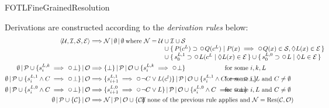 \begin{entry}{FOTLFineGrainedResolution}
\begin{calculus}
Derivations are constructed according to the \emph{derivation rules}
below:\vspace*{-2ex}
\begin{align*}
\langle \mathcal{U}, \mathcal{I}, \mathcal{S}, \mathcal{E} \rangle
&\Longrightarrow
\ProverState{\mathcal{N}}{\emptyset}{\emptyset}
\parbox[t]{25em}{\ 
\begin{tabular}[t]{@{}l@{}}
where
$\mathcal{N} = \mathcal{U}
\begin{array}[t]{@{}l@{}}
\hbox{}\cup \mathcal{I} \cup \mathcal{S}\\
\hbox{}\cup \Set{P(c^L) \supset \Next Q(c^L)}{P(x) \implies \Next Q(x) \in
  \mathcal{S}, \Eventually L(x)\in\mathcal{E}}\\
\hbox{}\cup \Set{s^{L,1}_0 \supset \Next L(c^L}{\Eventually L(x) \in
  \mathcal{E}}
\cup \Set{s^{L,0}_0 \supset \Next L}{\Eventually L \in
  \mathcal{E}}
\end{array}
$
\end{tabular}}
\\
\ProverState{\emptyset}{\ProcessedSet \cup 
\SetEnum{s^{L,k}_i \implies \Next\EmptyClause}}{\OldSet}
&\Longrightarrow
\makebox[187pt][l]{$\ProverState{\SetEnum{\EmptyClause}}{\ProcessedSet}{\OldSet \cup 
\SetEnum{s^{L,k}_i \implies \Next \EmptyClause}}$}
\mbox{ for some $i, k, L$}
\\
\ProverState{\emptyset}{\ProcessedSet \cup 
\SetEnum{s^{L,1}_i \land C \implies \Next\EmptyClause}}{\OldSet}
&\Longrightarrow
\makebox[187pt][l]{\ProverState{\SetEnum{s^{L,1}_{i+1} \implies \Next \lnot C \lor
L(c^l)}}{\ProcessedSet}{\OldSet \cup 
\SetEnum{s^{L,1}_i \land C \implies\Next\EmptyClause}}}
\mbox{ for some $i,L$ and $C \neq \emptyset$}\makebox[12pt][l]{}
\\
\ProverState{\emptyset}{\ProcessedSet \cup 
\SetEnum{s^{L,0}_i \land C \implies \Next\EmptyClause}}{\OldSet}
&\Longrightarrow
\makebox[187pt][l]{$\ProverState{\SetEnum{s^{L,0}_{i+1} \implies \Next \lnot C \lor
L}}{\ProcessedSet}{\OldSet \cup 
\SetEnum{s^{L,0}_i \land C \implies\Next\EmptyClause}}$}
\mbox{ for some $i,L$ and $C \neq \emptyset$}
\\
\ProverState{\emptyset}{\ProcessedSet \cup \SetEnum{\mathcal{C}}}{\OldSet}
&\Longrightarrow
\makebox[56pt][l]{$\ProverState{\NewSet}{\ProcessedSet}{\OldSet \cup \SetEnum{\mathcal{C}}}$}
\mbox{ if none of the previous rule applies and $\NewSet = \mathrm{Res}(\mathcal{C}, \OldSet)$}

\end{align*}
\end{calculus}
\end{entry}
